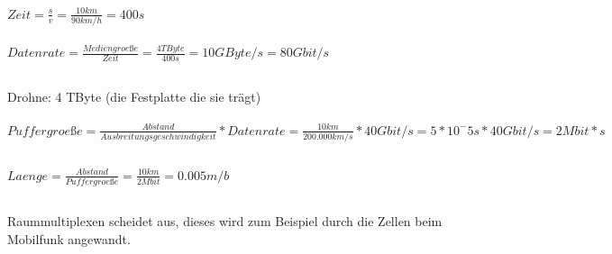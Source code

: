 \documentclass[a4paper]{article}
\begin{document}
\subsection{}
$Zeit =\frac{s}{v} = \frac{10km}{90km/h} = 400s$\\\\
$Datenrate = \frac{Mediengroeße}{Zeit} = \frac{4 TByte}{400s} = 10 GByte/s = 80 Gbit/s$
\subsection{}
Drohne: 4 TByte (die Festplatte die sie trägt) \\\\
$Puffergroeße = \frac{Abstand}{Ausbreitungsgeschwindigkeit} * Datenrate = \frac{10km}{200.000 km/s} * 40 Gbit/s
= 5 * 10^-5 s * 40 Gbit/s = 2 Mbit*s $
\subsection{}
$Laenge = \frac{Abstand}{Puffergroeße} = \frac{10km}{2Mbit} = 0.005 m/b$
\subsection{}
\subsection{}
Raummultiplexen scheidet aus, dieses wird zum Beispiel durch die Zellen beim Mobilfunk angewandt.
\pagebreak
\section{}
\begin{center}
\end{center}
\end{document}
